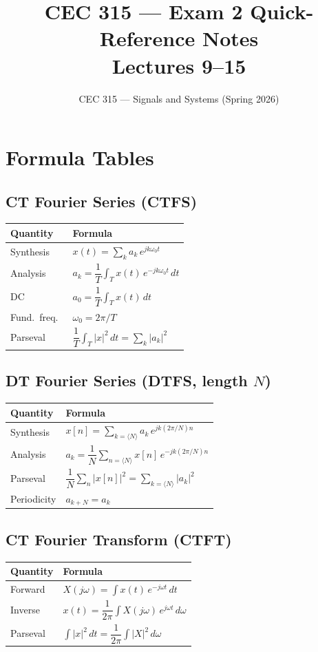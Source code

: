 \documentclass[11pt]{article}
\title{CEC 315 --- Exam 2 Quick-Reference Notes\\\large Lectures 9--15}
\author{CEC 315 --- Signals and Systems (Spring 2026)}
\date{}
\begin{document}
\maketitle
\tableofcontents
\newpage

\section{Formula Tables}

\subsection{CT Fourier Series (CTFS)}
\begin{center}
\begin{tabular}{|l|l|}
\hline
Quantity & Formula\\
\hline
Synthesis & $x(t) = \sum_k a_k\, e^{jk\omega_0 t}$\\
Analysis  & $a_k = \dfrac{1}{T}\int_T x(t)\, e^{-jk\omega_0 t}\, dt$\\
DC        & $a_0 = \dfrac{1}{T}\int_T x(t)\, dt$\\
Fund.\ freq.\ & $\omega_0 = 2\pi/T$\\
Parseval  & $\dfrac{1}{T}\int_T |x|^2\, dt = \sum_k |a_k|^2$\\
\hline
\end{tabular}
\end{center}

\subsection{DT Fourier Series (DTFS, length $N$)}
\begin{center}
\begin{tabular}{|l|l|}
\hline
Quantity & Formula\\
\hline
Synthesis & $x[n] = \sum_{k=\langle N\rangle} a_k\, e^{jk(2\pi/N)n}$\\
Analysis  & $a_k = \dfrac{1}{N}\sum_{n=\langle N\rangle} x[n]\, e^{-jk(2\pi/N)n}$\\
Parseval  & $\dfrac{1}{N}\sum_n |x[n]|^2 = \sum_{k=\langle N\rangle} |a_k|^2$\\
Periodicity & $a_{k+N} = a_k$\\
\hline
\end{tabular}
\end{center}

\subsection{CT Fourier Transform (CTFT)}
\begin{center}
\begin{tabular}{|l|l|}
\hline
Quantity & Formula\\
\hline
Forward  & $X(j\omega) = \int x(t)\, e^{-j\omega t}\, dt$\\
Inverse  & $x(t) = \dfrac{1}{2\pi}\int X(j\omega)\, e^{j\omega t}\, d\omega$\\
Parseval & $\int |x|^2\, dt = \dfrac{1}{2\pi}\int |X|^2\, d\omega$\\
\hline
\end{tabular}
\end{center}
\end{document}
